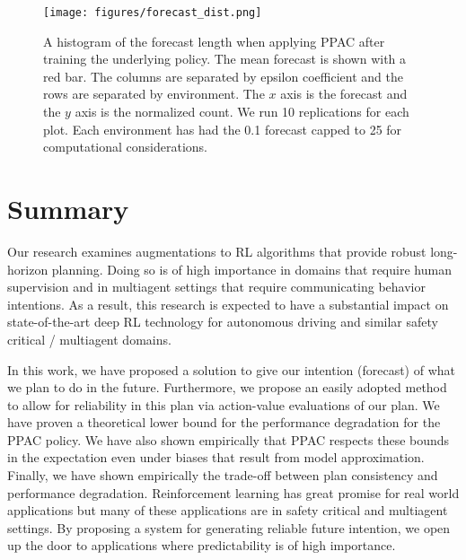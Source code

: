 \documentclass{article}
\begin{document}



            \begin{figure}[!h]
                \texttt{[image: figures/forecast\_dist.png]}
                \caption{A histogram of the forecast length when applying  PPAC after training the underlying policy. The mean forecast is shown with a red bar. The columns are separated by epsilon coefficient and the rows are separated by environment. The $x$ axis is the forecast and the $y$ axis is the normalized count. We run 10 replications for each plot. Each environment has had the 0.1 forecast capped to 25 for computational considerations.}
                \label{forecast-dist}
            \end{figure}


    \section{Summary}
        Our research examines augmentations to RL algorithms that provide robust long-horizon planning. Doing so is of high importance in domains that require human supervision and in multiagent settings that require communicating behavior intentions. As a result, this research is expected to have a substantial impact on state-of-the-art deep RL technology for autonomous driving and similar safety critical / multiagent domains.

        In this work, we have proposed a solution to give our intention (forecast) of what we plan to do in the future. Furthermore, we propose an easily adopted method to allow for reliability in this plan via action-value evaluations of our plan. We have proven a theoretical lower bound for the performance degradation for the PPAC policy. We have also shown empirically that PPAC respects these bounds in the expectation even under biases that result from model approximation. Finally, we have shown empirically the trade-off between plan consistency and performance degradation. Reinforcement learning has great promise for real world applications but many of these applications are in safety critical and multiagent settings. By proposing a system for generating reliable future intention, we open up the door to applications where predictability is of high importance.
\end{document}
